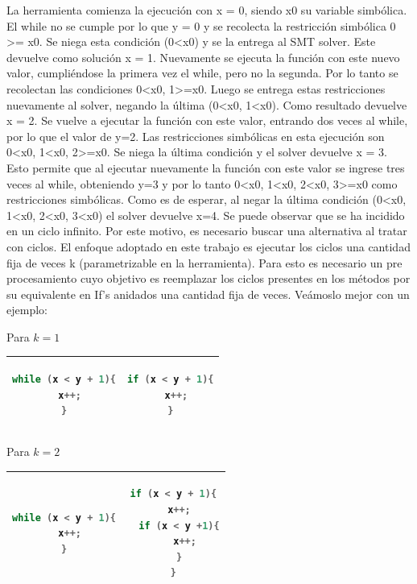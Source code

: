 \documentclass{llncs}
\begin{document}
La herramienta comienza la ejecución con x = 0, siendo x0 su variable simbólica. El while no se cumple por lo que y = 0 y se recolecta la restricción
simbólica 0 >= x0. Se niega esta condición (0<x0) y se la entrega al SMT solver. Este devuelve como solución x = 1. Nuevamente se ejecuta la función con
este nuevo valor, cumpliéndose la primera vez el while, pero no la segunda. Por lo tanto se recolectan las condiciones 0<x0, 1>=x0. Luego se entrega estas
restricciones nuevamente al solver, negando la última (0<x0, 1<x0). Como resultado devuelve x = 2. Se vuelve a ejecutar la función con este valor,
entrando dos veces al while, por lo que el valor de y=2. Las restricciones simbólicas en esta ejecución son 0<x0, 1<x0, 2>=x0. Se niega la última condición
y el solver devuelve x = 3. Esto permite que al ejecutar nuevamente la función con este valor se ingrese tres veces al while, obteniendo y=3 y por lo tanto 0<x0,
1<x0, 2<x0, 3>=x0 como restricciones simbólicas. Como es de esperar, al negar la última condición (0<x0, 1<x0, 2<x0, 3<x0) el solver devuelve x=4. 
Se puede observar que se ha incidido en un ciclo infinito. Por este motivo, es necesario buscar una alternativa al tratar con ciclos. El enfoque adoptado
en este trabajo es ejecutar los ciclos una cantidad fija de veces k (parametrizable en la herramienta).
Para esto es necesario un pre procesamiento cuyo objetivo es reemplazar los ciclos presentes en los métodos por su equivalente en If’s anidados una cantidad
fija de veces. Veámoslo mejor con un ejemplo:\\
\newline

Para \(k = 1\)
\begin{table}
\centering
\begin{tabular}{|c | c|}
\hline
\begin{lstlisting}[language=Java]
while (x < y + 1){
  x++;
}
\end{lstlisting} & 
\begin{lstlisting}[language=Java]
if (x < y + 1){
  x++;
}
\end{lstlisting}\\
\hline
\end{tabular}
\end{table}

Para \(k = 2\)
\begin{table}
\centering
\begin{tabular}{|c | c|}
\hline
\begin{lstlisting}[language=Java]
while (x < y + 1){
  x++;
}
\end{lstlisting} & 
\begin{lstlisting}[language=Java]
if (x < y + 1){
  x++;
  if (x < y +1){
    x++;
  }
}
\end{lstlisting}\\
\hline
\end{tabular}
\end{table}
\end{document}
